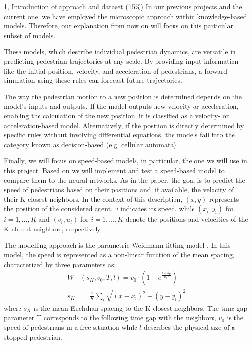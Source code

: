 \begin{task}{1, Introduction of approach and dataset (15\%)}
In our previous projects and the current one, we have employed the microscopic approach within knowledge-based models. Therefore, our explanation from now on will focus on this particular subset of models.

These models, which describe individual pedestrian dynamics, are versatile in predicting pedestrian trajectories at any scale. By providing input information like the initial position, velocity, and acceleration of pedestrians, a forward simulation using these rules can forecast future trajectories.

The way the pedestrian motion to a new position is determined depends on the model's inputs and outputs. If the model outputs new velocity or acceleration, enabling the calculation of the new position, it is classified as a velocity- or acceleration-based model. Alternatively, if the position is directly determined by specific rules without involving differential equations, the models fall into the category known as decision-based (e.g. cellular automata).

Finally, we will focus on speed-based models, in particular, the one we will use in this project. Based on \cite{tordeux2020prediction} we will implement and test a speed-based model to compare them to the neural networks. As in the paper, the goal is to predict the speed of pedestrians based on their positions and, if available, the velocity of their K closest neighbors. In the context of this description, \((x, y)\) represents the position of the considered agent, \(v\) indicates its speed, while \((x_i, y_i)\) for \(i = 1, ..., K\) and \((v_i, u_i)\) for \(i = 1, ..., K\) denote the positions and velocities of the K closest neighbors, respectively. 

The  modelling approach is the parametric Weidmann fitting model \cite{weidmann1993transporttechnik}. In this model, the speed is represented as a non-linear function of the mean spacing, characterized by three parameters as:
\begin{align}
    W&(\overline{s}_K, v_0, T, l) = v_0\cdot\left(1-e^{\frac{l-\overline{s}_K}{v_0 T}}\right)\label{exp_tor}\\
    \overline{s}_K &= \frac{1}{K}\sum_i\sqrt{(x-x_i)^2 + (y-y_i)^2}\label{exp_mean}
\end{align}
where \(\overline{s}_K\) is the mean Euclidian spacing to the K closest neighbors. The time gap parameter T
corresponds to the following time gap with the neighbors, \(v_0\) is the speed of pedestrians
in a free situation while \(l\) describes the physical size of a stopped pedestrian. 


\end{task}
